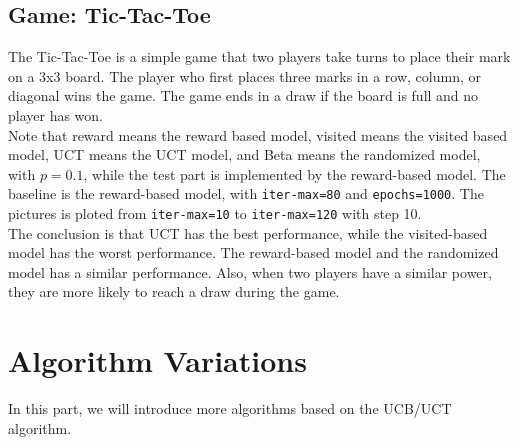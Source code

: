 \documentclass{article}
\begin{document}
\subsection{Game: Tic-Tac-Toe}
The Tic-Tac-Toe is a simple game that two players take turns to place their mark on a 3x3 board. The player who first places three marks in a row, column, or diagonal wins the game. The game ends in a draw if the board is full and no player has won.\\
Note that reward means the reward based model, visited means the visited based model, UCT means the UCT model, and Beta means the randomized model, with $p=0.1$, while the test part is implemented by the reward-based model.
The baseline is the reward-based model, with \texttt{iter-max=80} and \texttt{epochs=1000}. The pictures is ploted from \texttt{iter-max=10} to \texttt{iter-max=120} with step 10.\\
The conclusion is that UCT has the best performance, while the visited-based model has the worst performance. The reward-based model and the randomized model has a similar performance. Also, when two players have a similar power, they are more likely to reach a draw during the game.\\
\section{Algorithm Variations}
In this part, we will introduce more algorithms based on the UCB/UCT algorithm.\\
\end{document}

